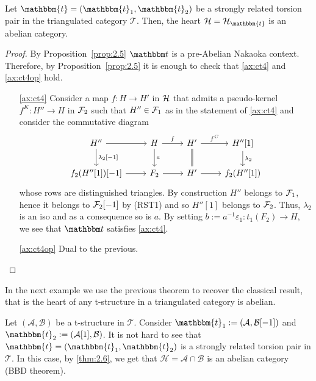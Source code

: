 \begin{thm}\label{thm:2.6}
  Let $\mathbbm{t}=(\mathbbm{t}_1,\mathbbm{t}_2)$ be a strongly related torsion pair in
  the triangulated category $\mathcal{T}$. Then, the heart $\mathcal{H}=\mathcal{H}_\mathbbm{t}$
  is an abelian category.
\end{thm}

\begin{proof}
  By Proposition~\ref{prop:2.5} $\t$ is a pre-Abelian Nakaoka context. Therefore, by Proposition~\ref{prop:2.5} it is enough to check that \ref{ax:ct4} and \ref{ax:ct4op} hold.

  \begin{itemize}
    \item[\ref{ax:ct4}] Consider a map $f\colon H\to H'$ in $\mathcal{H}$ that admits a pseudo-kernel $f^K\colon H''\to H$ in $\mathcal{F}_2$ such that $H''\in\mathcal{F}_1$ as in the statement of \ref{ax:ct4} and consider the commutative diagram 
      \begin{equation*}
        \begin{tikzcd}
          H''\arrow{r}\arrow{d}{\lambda_2[-1]}
          & H\arrow{r}{f}\arrow{d}{a}
          & H'\arrow{r}{f^C}\arrow[equal]{d}
          & H''[1]\arrow{d}{\lambda_2}\\
          f_2(H''[1])[-1]\arrow{r}
          & F_2\arrow{r}
          & H'\arrow{r}
          & f_2(H''[1])
        \end{tikzcd}
      \end{equation*}
      whose rows are distinguished triangles. By construction $H''$ belongs to $\mathcal{F}_1$, hence it belongs to $\mathcal{F}_2[-1]$ by (RST1) and so $H''[1]$ belongs to $\mathcal{F}_2$. Thus, $\lambda_2$ is an iso and as a consequence so is $a$. By setting $b:= a^{-1}\varepsilon_1\colon t_1(F_2)\to H$, we see that $\t$ satisfies \ref{ax:ct4}.
    \item[\ref{ax:ct4op}] Dual to the previous.
  \end{itemize}
\end{proof}

In the next example we use the previous theorem to recover the classical result, that is the heart of any t-structure in a triangulated category is abelian.

\begin{example}
  Let $(\mathcal{A},\mathcal{B})$ be a t-structure in $\mathcal{T}$. Consider
  $\mathbbm{t}_1:=(\mathcal{A},\mathcal{B}[-1])$ and $\mathbbm{t}_2 :=(\mathcal{A}[1],\mathcal{B})$.
  It is not hard to see that $\mathbbm{t}=(\mathbbm{t}_1,\mathbbm{t}_2)$ is a strongly related
  torsion pair in $\mathcal{T}$. In this case, by \ref{thm:2.6}, we get that $\mathcal{H}=\mathcal{A}\cap\mathcal{B}$
  is an abelian category (BBD theorem).
\end{example}

